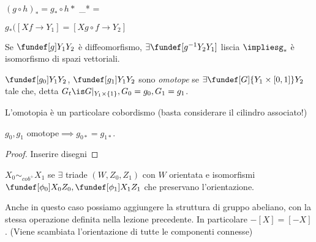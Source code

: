 
\begin{oss}
 $(g\circ h )_* = g_*\circ h*$
 \id_* = \id
\end{oss}
$g_*(\left[ X f\rightarrow Y_1 \right] = \left[X g\circ f \rightarrow Y_2 \right]$
\begin{oss}
 Se $\fundef[g]Y_1Y_2$ è diffeomorfismo, $\exists \fundef[g^{-1}Y_2Y_1]$ liscia $\impliesg_*$ è isomorfismo di spazi vettoriali.
\end{oss}
\begin{def}[Omotopia]
 $\fundef[g_0]Y_1Y_2$, $\fundef[g_1]Y_1Y_2$ sono \emph{omotope} se $\exists \fundef[G]{Y_1\times\left[ 0,1\right]}Y_2$ tale che,
 detta $G_t\is  G|_{Y_1\times \left \{ 1\right \}}, G_0=g_0, G_1=g_1$.
\end{def}
 \begin{oss}
  L'omotopia è un particolare cobordismo (basta considerare il cilindro associato!)
 \end{oss}
\begin{prop}
 $g_0, g_1$ omotope$\implies g_{0*}=g_{1*}$.
\end{prop}
\begin{proof}
 Inserire disegni
\end{proof}
\begin{def}
 $X_0\sim_{cob^+}X_1$ se $\exists$ triade $(W, Z_0, Z_1)$ con $W$ orientata e isomorfismi $\fundef[\phi_0]X_0Z_0, \fundef[\phi_1]X_1Z_1$
 che preservano l'orientazione.
\end{def}
\begin{oss}
 Anche in questo caso possiamo aggiungere la struttura di gruppo abeliano, con la stessa operazione definita nella lezione precedente.
 In particolare $-\left[ X\right]=\left[-X\right]$. (Viene scambiata l'orientazione di tutte le componenti connesse)
\end{oss}
